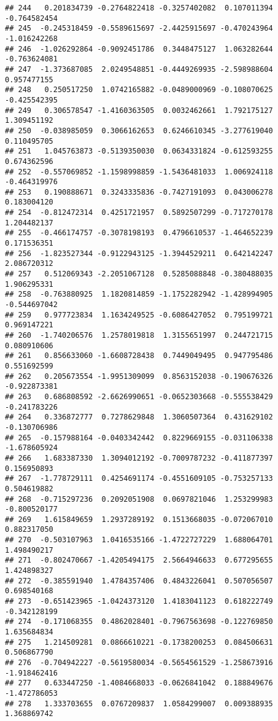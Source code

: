 \documentclass[
]{article}
\begin{document}
\begin{verbatim}
## 244   0.201834739 -0.2764822418 -0.3257402082  0.107011394 -0.764582454
## 245  -0.245318459 -0.5589615697 -2.4425915697 -0.470243964 -1.016242268
## 246  -1.026292864 -0.9092451786  0.3448475127  1.063282644 -0.763624081
## 247  -1.373687085  2.0249548851 -0.4449269935 -2.598988604  0.957477155
## 248   0.250517250  1.0742165882 -0.0489000969 -0.108070625 -0.425542395
## 249   0.306578547 -1.4160363505  0.0032462661  1.792175127  1.309451192
## 250  -0.038985059  0.3066162653  0.6246610345 -3.277619040  0.110495705
## 251   1.045763873 -0.5139350030  0.0634331824 -0.612593255  0.674362596
## 252  -0.557069852 -1.1598998859 -1.5436481033  1.006924118 -0.464319976
## 253   0.190888671  0.3243335836 -0.7427191093  0.043006278  0.183004120
## 254  -0.812472314  0.4251721957  0.5892507299 -0.717270178  1.204482137
## 255  -0.466174757 -0.3078198193  0.4796610537 -1.464652239  0.171536351
## 256  -1.823527344 -0.9122943125 -1.3944529211  0.642142247  2.086720312
## 257   0.512069343 -2.2051067128  0.5285088848 -0.380488035  1.906295331
## 258  -0.763880925  1.1820814859 -1.1752282942 -1.428994905 -0.544697042
## 259   0.977723834  1.1634249525 -0.6086427052  0.795199721  0.969147221
## 260  -1.740206576  1.2578019818  1.3155651997  0.244721715  0.080910606
## 261   0.856633060 -1.6608728438  0.7449049495  0.947795486  0.551692599
## 262   0.205673554 -1.9951309099  0.8563152038 -0.190676326 -0.922873381
## 263   0.686808592 -2.6626990651 -0.0652303668 -0.555538429 -0.241783226
## 264   0.336872777  0.7278629848  1.3060507364  0.431629102 -0.130706986
## 265  -0.157988164 -0.0403342442  0.8229669155 -0.031106338 -1.678605924
## 266   1.683387330  1.3094012192 -0.7009787232 -0.411877397  0.156950893
## 267  -1.778729111  0.4254691174 -0.4551609105 -0.753257133  0.504619882
## 268  -0.715297236  0.2092051908  0.0697821046  1.253299983 -0.800520177
## 269   1.615849659  1.2937289192  0.1513668035 -0.072067010  0.882317050
## 270  -0.503107963  1.0416535166 -1.4722727229  1.688064701  1.498490217
## 271  -0.802470667 -1.4205494175  2.5664946633  0.677295655  1.424898327
## 272  -0.385591940  1.4784357406  0.4843226041  0.507056507  0.698540168
## 273  -0.651423965 -1.0424373120  1.4183041123  0.618222749 -0.342128199
## 274  -0.171068355  0.4862028401 -0.7967563698 -0.122769850  1.635684834
## 275   1.214509281  0.0866610221 -0.1738200253  0.084506631  0.506867790
## 276  -0.704942227 -0.5619580034 -0.5654561529 -1.258673916 -1.918462416
## 277   0.633447250 -1.4084668033 -0.0626841042  0.188849676 -1.472786053
## 278   1.333703655  0.0767209837  1.0584299007  0.009388935  1.368869742

\end{verbatim}
\end{document}
